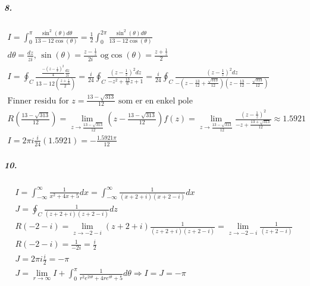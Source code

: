 \documentclass[11pt, A4paper,norsk]{article}
\begin{document}
			\subparagraph{8.}
				\begin{gather*}
I = \int_{0}^{\pi} \frac{\sin^2(\theta) d\theta}{13 - 12\cos(\theta)} = \frac{1}{2} \int_{0}^{2\pi} \frac{\sin^2(\theta) d\theta}{13 - 12\cos(\theta)} \\
d\theta = \frac{dz}{zi} \text{, } \sin(\theta) = \frac{z - \frac{1}{z}}{2i} \text{ og} \cos(\theta) = \frac{z + \frac{1}{z}}{2} \\
I = \oint_{C} \frac{\frac{-(z - \frac{1}{z})^2}{4} \frac{dz}{zi}}{13 - 12\left(\frac{z + \frac{1}{z}}{2}\right)} = \frac{i}{24} \oint_{C} \frac{(z - \frac{1}{z})^2 dz}{- z^2 + \frac{13}{6}z + 1} = \frac{i}{24} \oint_{C} \frac{(z - \frac{1}{z})^2 dz}{-(z - \frac{13}{12} + \frac{\sqrt{313}}{12})(z - \frac{13}{12} - \frac{\sqrt{313}}{12})} \\
\text{Finner residu for $z = \frac{13 - \sqrt{313}}{12}$ som er en enkel pole} \\
R\left(\frac{13 - \sqrt{313}}{12}\right) = \lim_{z \rightarrow \frac{13 - \sqrt{313}}{12}}\left(z - \frac{13 - \sqrt{313}}{12}\right) f(z) = \lim_{z \rightarrow \frac{13 - \sqrt{313}}{12}} \frac{(z - \frac{1}{z})^2}{- z + \frac{13 + \sqrt{313}}{12}} \approx 1.5921 \\
I = 2 \pi i \frac{i}{24} (1.5921) = - \frac{1.5921 \pi}{12}
				\end{gather*}












			\subparagraph{10.}
				\begin{gather*}
I = \int_{- \infty}^{\infty} \frac{1}{x^2 + 4x + 5} dx = \int_{- \infty}^{\infty} \frac{1}{(x + 2 + i)(x + 2 - i)} dx \\
J = \oint_{C} \frac{1}{(z + 2 + i)(z + 2 - i)} dz \\
R(- 2 - i) = \lim_{z \rightarrow - 2 - i} (z + 2 + i) \frac{1}{(z + 2 + i)(z + 2 - i)} = \lim_{z \rightarrow - 2 - i} \frac{1}{(z + 2 - i)} \\
R(- 2 - i) = \frac{1}{-2i} = \frac{i}{2} \\
J = 2 \pi i \frac{i}{2} = - \pi \\
J = \lim_{r \rightarrow \infty} I + \int_{0}^{\pi} \frac{1}{r^2e^{2i\theta} + 4re^{i\theta} + 5} d\theta \Rightarrow I = J = -\pi
				\end{gather*}
\end{document}
